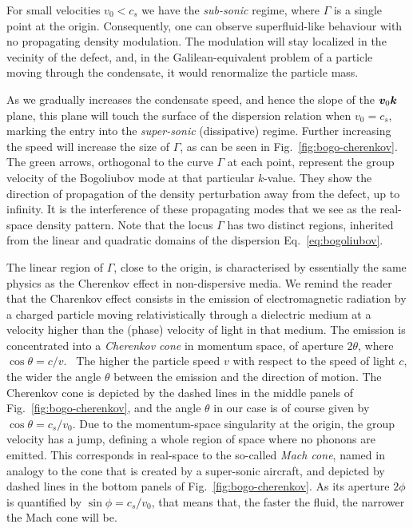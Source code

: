 For small velocities $v_0 < c_s$ we have the \textit{sub-sonic}
regime, where $\Gamma$ is a single point at the origin. Consequently,
one can observe superfluid-like behaviour with no propagating density
modulation. The modulation will stay localized in the vecinity of the
defect, and, in the Galilean-equivalent problem of a particle moving
through the condensate, it would renormalize the particle
mass.~\cite{Astrakharchik_2004}

As we gradually increases the condensate speed, and hence the slope of
the $\bm{v}_0 \bm{k}$ plane, this plane will touch the surface of the
dispersion relation when $v_0 = c_s$, marking the entry into the
\textit{super-sonic} (dissipative) regime. Further increasing the
speed will increase the size of $\Gamma$, as can be seen in
Fig.~\ref{fig:bogo-cherenkov}. The green arrows, orthogonal to the
curve $\Gamma$ at each point, represent the group velocity of the
Bogoliubov mode at that particular $k$-value. They show the direction
of propagation of the density perturbation away from the defect, up to
infinity. It is the interference of these propagating modes that we
see as the real-space density pattern. Note that the locus $\Gamma$
has two distinct regions, inherited from the linear and quadratic
domains of the dispersion Eq.~\eqref{eq:bogoliubov}.

The linear region of $\Gamma$, close to the origin, is characterised
by essentially the same physics as the Cherenkov effect in
non-dispersive media. We remind the reader that the Charenkov effect
consists in the emission of electromagnetic radiation by a charged
particle moving relativistically through a dielectric medium at a
velocity higher than the (phase) velocity of light in that medium. The
emission is concentrated into a \textit{Cherenkov cone} in momentum
space, of aperture $2\theta$, where
$\cos\theta = c/v$.~\cite{jelley1958vcerenkov} The higher the
particle speed $v$ with respect to the speed of light $c$, the wider
the angle $\theta$ between the emission and the direction of
motion. The Cherenkov cone is depicted by the dashed lines in the
middle panels of Fig.~\ref{fig:bogo-cherenkov}, and the angle $\theta$
in our case is of course given by $\cos\theta = c_s/v_0$. Due to the
momentum-space singularity at the origin, the group velocity has a
jump, defining a whole region of space where no phonons are
emitted. This corresponds in real-space to the so-called \textit{Mach
  cone}, named in analogy to the cone that is created by a super-sonic
aircraft, and depicted by dashed lines in the bottom panels of
Fig.~\ref{fig:bogo-cherenkov}. As its aperture $2\phi$ is quantified
by $\sin\phi = c_s/v_0$, that means that, the faster the fluid, the
narrower the Mach cone will be.

